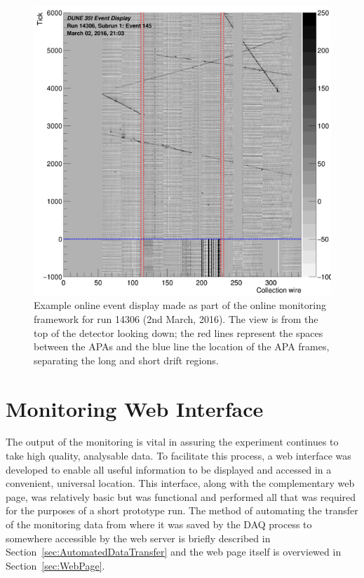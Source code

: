\begin{figure}
  \centering
  \includegraphics[width=14cm]{evd.png}
  \caption[Example online event display made by the Online Monitoring framework]{Example online event display made as part of the online monitoring framework for run 14306 (2nd March, 2016).  The view is from the top of the detector looking down; the red lines represent the spaces between the APAs and the blue line the location of the APA frames, separating the long and short drift regions.}
  \label{fig:EVD}
\end{figure}

\section{Monitoring Web Interface}\label{sec:WebInterface}

The output of the monitoring is vital in assuring the experiment continues to take high quality, analysable data.  To facilitate this process, a web interface was developed to enable all useful information to be displayed and accessed in a convenient, universal location.  This interface, along with the complementary web page, was relatively basic but was functional and performed all that was required for the purposes of a short prototype run.  The method of automating the transfer of the monitoring data from where it was saved by the DAQ process to somewhere accessible by the web server is briefly described in Section~\ref{sec:AutomatedDataTransfer} and the web page itself is overviewed in Section~\ref{sec:WebPage}.

